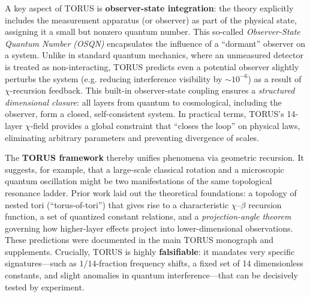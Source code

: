 \documentclass[12pt]{article}
\begin{document}
A key aspect of TORUS is \textbf{observer-state integration}: the theory explicitly includes the measurement apparatus (or observer) as part of the physical state, assigning it a small but nonzero quantum number. This so-called \emph{Observer-State Quantum Number (OSQN)} encapsulates the influence of a ``dormant'' observer on a system. Unlike in standard quantum mechanics, where an unmeasured detector is treated as non-interacting, TORUS predicts even a potential observer slightly perturbs the system (e.g. reducing interference visibility by $\sim 10^{-6}$) as a result of $\chi$-recursion feedback. This built-in observer-state coupling ensures a \emph{structured dimensional closure}: all layers from quantum to cosmological, including the observer, form a closed, self-consistent system. In practical terms, TORUS’s 14-layer $\chi$-field provides a global constraint that ``closes the loop'' on physical laws, eliminating arbitrary parameters and preventing divergence of scales. 

The \textbf{TORUS framework} thereby unifies phenomena via geometric recursion. It suggests, for example, that a large-scale classical rotation and a microscopic quantum oscillation might be two manifestations of the same topological resonance ladder. Prior work laid out the theoretical foundations: a topology of nested tori (``torus-of-tori'') that gives rise to a characteristic $\chi$–$\beta$ recursion function, a set of quantized constant relations, and a \emph{projection-angle theorem} governing how higher-layer effects project into lower-dimensional observations. These predictions were documented in the main TORUS monograph and supplements. Crucially, TORUS is highly \textbf{falsifiable}: it mandates very specific signatures—such as $1/14$-fraction frequency shifts, a fixed set of 14 dimensionless constants, and slight anomalies in quantum interference—that can be decisively tested by experiment. 
\end{document}
